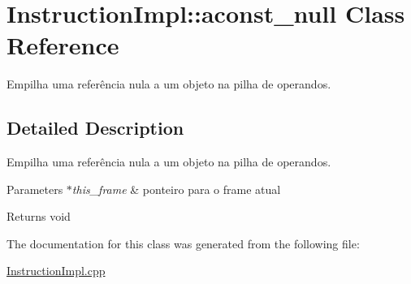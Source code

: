 \hypertarget{class_instruction_impl_1_1aconst__null}{}\section{Instruction\+Impl\+:\+:aconst\+\_\+null Class Reference}
\label{class_instruction_impl_1_1aconst__null}


Empilha uma referência nula a um objeto na pilha de operandos.  




\subsection{Detailed Description}
Empilha uma referência nula a um objeto na pilha de operandos. 


\begin{DoxyParams}{Parameters}
{\em $\ast$this\+\_\+frame} & ponteiro para o frame atual \\
\hline
\end{DoxyParams}
\begin{DoxyReturn}{Returns}
void 
\end{DoxyReturn}


The documentation for this class was generated from the following file\+:\begin{DoxyCompactItemize}
\item 
\hyperlink{_instruction_impl_8cpp}{Instruction\+Impl.\+cpp}\end{DoxyCompactItemize}
